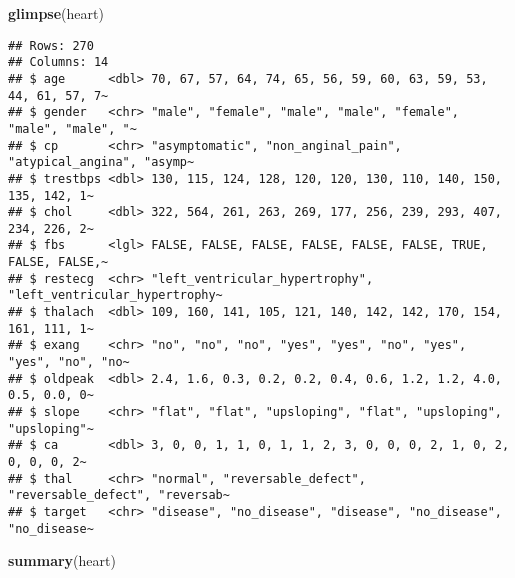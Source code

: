 \documentclass[
]{article}
\newenvironment{Shaded}{\begin{snugshade}}{\end{snugshade}}
\newcommand{\FunctionTok}[1]{\textcolor[rgb]{0.13,0.29,0.53}{\textbf{#1}}}
\newcommand{\NormalTok}[1]{#1}
\begin{document}
\begin{Shaded}
\begin{Highlighting}[]
\FunctionTok{glimpse}\NormalTok{(heart)}
\end{Highlighting}
\end{Shaded}

\begin{verbatim}
## Rows: 270
## Columns: 14
## $ age      <dbl> 70, 67, 57, 64, 74, 65, 56, 59, 60, 63, 59, 53, 44, 61, 57, 7~
## $ gender   <chr> "male", "female", "male", "male", "female", "male", "male", "~
## $ cp       <chr> "asymptomatic", "non_anginal_pain", "atypical_angina", "asymp~
## $ trestbps <dbl> 130, 115, 124, 128, 120, 120, 130, 110, 140, 150, 135, 142, 1~
## $ chol     <dbl> 322, 564, 261, 263, 269, 177, 256, 239, 293, 407, 234, 226, 2~
## $ fbs      <lgl> FALSE, FALSE, FALSE, FALSE, FALSE, FALSE, TRUE, FALSE, FALSE,~
## $ restecg  <chr> "left_ventricular_hypertrophy", "left_ventricular_hypertrophy~
## $ thalach  <dbl> 109, 160, 141, 105, 121, 140, 142, 142, 170, 154, 161, 111, 1~
## $ exang    <chr> "no", "no", "no", "yes", "yes", "no", "yes", "yes", "no", "no~
## $ oldpeak  <dbl> 2.4, 1.6, 0.3, 0.2, 0.2, 0.4, 0.6, 1.2, 1.2, 4.0, 0.5, 0.0, 0~
## $ slope    <chr> "flat", "flat", "upsloping", "flat", "upsloping", "upsloping"~
## $ ca       <dbl> 3, 0, 0, 1, 1, 0, 1, 1, 2, 3, 0, 0, 0, 2, 1, 0, 2, 0, 0, 0, 2~
## $ thal     <chr> "normal", "reversable_defect", "reversable_defect", "reversab~
## $ target   <chr> "disease", "no_disease", "disease", "no_disease", "no_disease~
\end{verbatim}

\begin{Shaded}
\begin{Highlighting}[]
\FunctionTok{summary}\NormalTok{(heart)}
\end{Highlighting}
\end{Shaded}
\end{document}
